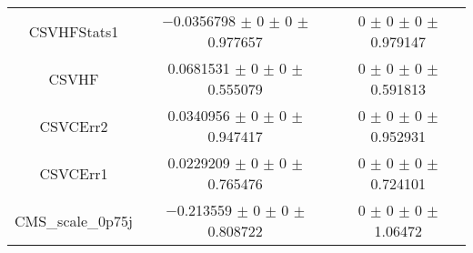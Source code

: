 \begin{table}
\begin{tabular}{ccc}
CSVHFStats1 & \num{-0.0356798} $\pm$ \num{0} $\pm$ \num{0} $\pm$ \num{0.977657} & \num{0} $\pm$ \num{0} $\pm$ \num{0} $\pm$ \num{0.979147}\\
CSVHF & \num{0.0681531} $\pm$ \num{0} $\pm$ \num{0} $\pm$ \num{0.555079} & \num{0} $\pm$ \num{0} $\pm$ \num{0} $\pm$ \num{0.591813}\\
CSVCErr2 & \num{0.0340956} $\pm$ \num{0} $\pm$ \num{0} $\pm$ \num{0.947417} & \num{0} $\pm$ \num{0} $\pm$ \num{0} $\pm$ \num{0.952931}\\
CSVCErr1 & \num{0.0229209} $\pm$ \num{0} $\pm$ \num{0} $\pm$ \num{0.765476} & \num{0} $\pm$ \num{0} $\pm$ \num{0} $\pm$ \num{0.724101}\\
CMS\_scale\_0p75j & \num{-0.213559} $\pm$ \num{0} $\pm$ \num{0} $\pm$ \num{0.808722} & \num{0} $\pm$ \num{0} $\pm$ \num{0} $\pm$ \num{1.06472}\\
\bottomrule
\end{tabular}
\end{table}